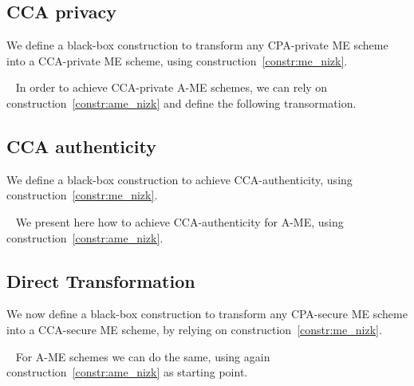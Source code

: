 \subsection{CCA privacy}
We define a black-box construction to transform any CPA-private ME scheme into a CCA-private ME scheme, using construction~\ref{constr:me_nizk}.

~\newline
In order to achieve CCA-private A-ME schemes, we can rely on construction~\ref{constr:ame_nizk} and define the following transormation.


\subsection{CCA authenticity}
We define a black-box construction to achieve CCA-authenticity, using construction~\ref{constr:me_nizk}.

~\newline
We present here how to achieve CCA-authenticity for A-ME, using construction~\ref{constr:ame_nizk}.


\subsection{Direct Transformation}
We now define a black-box construction to transform any CPA-secure ME scheme into a CCA-secure ME scheme, by relying on construction~\ref{constr:me_nizk}.

~\newline
For A-ME schemes we can do the same, using again construction~\ref{constr:ame_nizk} as starting point.

